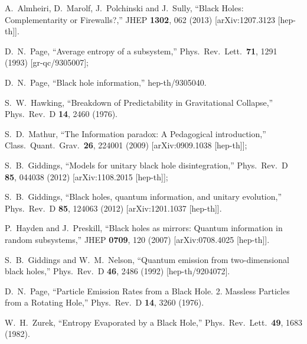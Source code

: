 \documentclass[12pt]{article}
\begin{document}
\begin{thebibliography}{99}
  A.~Almheiri, D.~Marolf, J.~Polchinski and J.~Sully,
  ``Black Holes: Complementarity or Firewalls?,''
  JHEP {\bf 1302}, 062 (2013)
  [arXiv:1207.3123 [hep-th]].

  D.~N.~Page,
  ``Average entropy of a subsystem,''
  Phys.\ Rev.\ Lett.\  {\bf 71}, 1291 (1993)
  [gr-qc/9305007];

  D.~N.~Page,
  ``Black hole information,''
  hep-th/9305040.

  S.~W.~Hawking,
  ``Breakdown of Predictability in Gravitational Collapse,''
  Phys.\ Rev.\ D {\bf 14}, 2460 (1976).

  S.~D.~Mathur,
  ``The Information paradox: A Pedagogical introduction,''
  Class.\ Quant.\ Grav.\  {\bf 26}, 224001 (2009)
  [arXiv:0909.1038 [hep-th]];

  S.~B.~Giddings,
  ``Models for unitary black hole disintegration,''
  Phys.\ Rev.\ D {\bf 85}, 044038 (2012)
  [arXiv:1108.2015 [hep-th]];


  S.~B.~Giddings,
  ``Black holes, quantum information, and unitary evolution,''
  Phys.\ Rev.\ D {\bf 85}, 124063 (2012)
  [arXiv:1201.1037 [hep-th]].

  P.~Hayden and J.~Preskill,
  ``Black holes as mirrors: Quantum information in random subsystems,''
  JHEP {\bf 0709}, 120 (2007)
  [arXiv:0708.4025 [hep-th]].


  S.~B.~Giddings and W.~M.~Nelson,
  ``Quantum emission from two-dimensional black holes,''
  Phys.\ Rev.\ D {\bf 46}, 2486 (1992)
  [hep-th/9204072].


  D.~N.~Page,
  ``Particle Emission Rates from a Black Hole. 2. Massless Particles from a Rotating Hole,''
  Phys.\ Rev.\ D {\bf 14}, 3260 (1976).

  W.~H.~Zurek,
  ``Entropy Evaporated by a Black Hole,''
  Phys.\ Rev.\ Lett.\  {\bf 49}, 1683 (1982).


\end{thebibliography}
\end{document}
